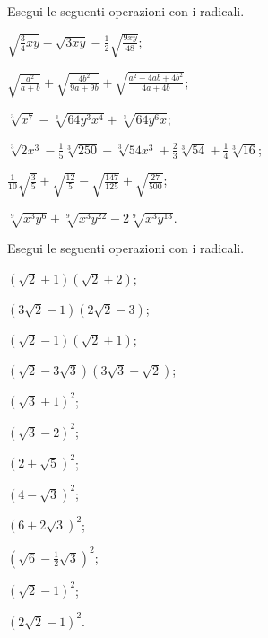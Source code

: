 \begin{esercizio}[\Ast]
 \label{ese:2.69}
Esegui le seguenti operazioni con i radicali.
 \begin{enumeratea}
 \item $\sqrt{\frac{3}{4}xy}-\sqrt{3xy}-\frac{1}{2}\sqrt{\frac{9xy}{48}}$;
 \item $\sqrt{\frac{a^{2}}{a+b}}+\sqrt{\frac{4b^{2}}{9a+9b}}+\sqrt{\frac{a^{2}-4ab+4b^{2}}{4a+4b}}$;
 \item $\sqrt[3]{x^{7}}-\sqrt[3]{64y^{3}x^{4}}+\sqrt[3]{64y^{6}x}$;
 \item $\sqrt[3]{2x^{3}}-\frac{1}{5}\sqrt[3]{250}-\sqrt[3]{54x^{3}}+\frac{2}{3}\sqrt[3]{54}+\frac{1}{4}\sqrt[3]{16}$;
 \item $\frac{1}{10}\sqrt{\frac{3}{5}}+\sqrt{\frac{12}{5}}-\sqrt{\frac{147}{125}}+\sqrt{\frac{27}{500}}$;
 \item $\sqrt[9]{x^{3}y^{6}}+\sqrt[9]{x^{3}y^{22}}-2\sqrt[9]{x^{3}y^{13}}$.
 \end{enumeratea}
\end{esercizio}

\begin{esercizio}[\Ast]
 \label{ese:2.70}
Esegui le seguenti operazioni con i radicali.
 \begin{multicols}{3}
 \begin{enumeratea}
 \item $(\sqrt 2+1)(\sqrt 2+2)$;
 \item $(3\sqrt 2-1)(2\sqrt 2-3)$;
 \item $(\sqrt 2-1)(\sqrt 2+1)$;
 \item $(\sqrt 2-3\sqrt 3)(3\sqrt 3-\sqrt 2)$;
 \item $(\sqrt 3+1)^2$;
 \item $(\sqrt 3-2)^2$;
 \item $(2+\sqrt 5)^2$;
 \item $(4-\sqrt 3)^2$;
 \item $(6+2\sqrt 3)^2$;
 \item $(\sqrt 6-\frac 1 2\sqrt 3)^2$;
 \item $(\sqrt 2-1)^2$;
 \item $(2\sqrt 2-1)^2$.
 \end{enumeratea}
 \end{multicols}
\end{esercizio}

